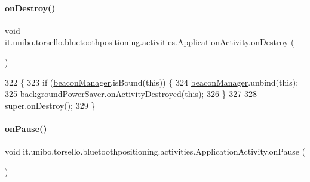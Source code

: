 \paragraph{\texorpdfstring{on\+Destroy()}{onDestroy()}}
{\footnotesize\ttfamily void it.\+unibo.\+torsello.\+bluetoothpositioning.\+activities.\+Application\+Activity.\+on\+Destroy (\begin{DoxyParamCaption}{ }\end{DoxyParamCaption})\hspace{0.3cm}{\ttfamily [protected]}}


\begin{DoxyCode}
322                                \{
323         \textcolor{keywordflow}{if} (\hyperlink{classit_1_1unibo_1_1torsello_1_1bluetoothpositioning_1_1activities_1_1ApplicationActivity_a973c37226a3dbba6016966c3555aff65_a973c37226a3dbba6016966c3555aff65}{beaconManager}.isBound(\textcolor{keyword}{this})) \{
324             \hyperlink{classit_1_1unibo_1_1torsello_1_1bluetoothpositioning_1_1activities_1_1ApplicationActivity_a973c37226a3dbba6016966c3555aff65_a973c37226a3dbba6016966c3555aff65}{beaconManager}.unbind(\textcolor{keyword}{this});
325             \hyperlink{classit_1_1unibo_1_1torsello_1_1bluetoothpositioning_1_1activities_1_1ApplicationActivity_a85885639575161f4d73d4fc788f44ace_a85885639575161f4d73d4fc788f44ace}{backgroundPowerSaver}.onActivityDestroyed(\textcolor{keyword}{this});
326         \}
327 
328         super.onDestroy();
329     \}
\end{DoxyCode}
\hypertarget{classit_1_1unibo_1_1torsello_1_1bluetoothpositioning_1_1activities_1_1ApplicationActivity_a06ed1cf654098045b1317b25067af877_a06ed1cf654098045b1317b25067af877}{}\label{classit_1_1unibo_1_1torsello_1_1bluetoothpositioning_1_1activities_1_1ApplicationActivity_a06ed1cf654098045b1317b25067af877_a06ed1cf654098045b1317b25067af877} 
\paragraph{\texorpdfstring{on\+Pause()}{onPause()}}
{\footnotesize\ttfamily void it.\+unibo.\+torsello.\+bluetoothpositioning.\+activities.\+Application\+Activity.\+on\+Pause (\begin{DoxyParamCaption}{ }\end{DoxyParamCaption})\hspace{0.3cm}{\ttfamily [protected]}}


